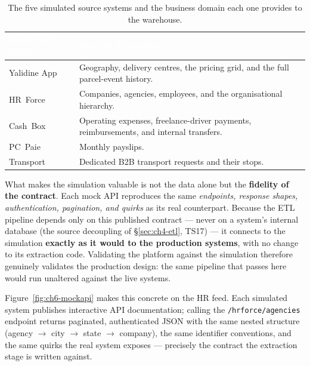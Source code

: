 \begin{table}[H]
\centering
\caption{The five simulated source systems and the business domain each one provides to the warehouse.}
\label{tab:ch6-sources}
\renewcommand{\arraystretch}{1.35}
\begin{tabularx}{\linewidth}{|>{\raggedright\arraybackslash}p{3.6cm}|>{\raggedright\arraybackslash}X|}
\hline
\rowcolor{tblheader}
\textcolor{white}{\textbf{Simulated system}} & \textcolor{white}{\textbf{Domain it provides}} \\
\hline
Yalidine App & Geography, delivery centres, the pricing grid, and the full parcel-event
history. \\
HR~Force & Companies, agencies, employees, and the organisational hierarchy. \\
Cash~Box & Operating expenses, freelance-driver payments, reimbursements, and internal
transfers. \\
PC~Paie & Monthly payslips. \\
Transport & Dedicated B2B transport requests and their stops. \\
\hline
\end{tabularx}
\end{table}

What makes the simulation valuable is not the data alone but the \textbf{fidelity of the contract}. Each
mock API reproduces the same \emph{endpoints, response shapes, authentication, pagination, and quirks}
as its real counterpart. Because the ETL pipeline depends only on this published contract --- never on a
system's internal database (the source decoupling of \S\ref{sec:ch4-etl}, TS17) --- it connects to the
simulation \textbf{exactly as it would to the production systems}, with no change to its extraction code.
Validating the platform against the simulation therefore genuinely validates the production design: the
same pipeline that passes here would run unaltered against the live systems.

Figure~\ref{fig:ch6-mockapi} makes this concrete on the HR feed. Each simulated system publishes
interactive API documentation; calling the \texttt{/hrforce/agencies} endpoint returns paginated,
authenticated JSON with the same nested structure (agency $\rightarrow$ city $\rightarrow$ state $\rightarrow$
company), the same identifier conventions, and the same quirks the real system exposes --- precisely the
contract the extraction stage is written against.

